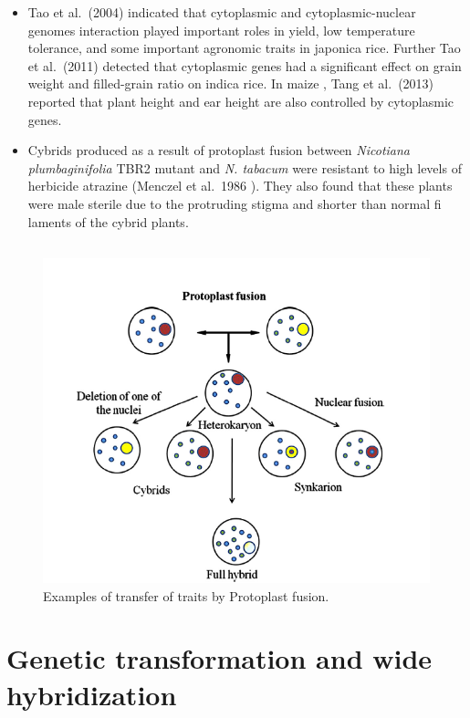 \documentclass[
  ignorenonframetext,
  aspectratio=169]{beamer}
\begin{document}
\begin{frame}{}
\begin{itemize}
\item
  Tao et al.~(2004) indicated that cytoplasmic and cytoplasmic-nuclear
  genomes interaction played important roles in yield, low temperature
  tolerance, and some important agronomic traits in japonica rice.
  Further Tao et al.~(2011) detected that cytoplasmic genes had a
  significant effect on grain weight and filled-grain ratio on indica
  rice. In maize , Tang et al.~(2013) reported that plant height and ear
  height are also controlled by cytoplasmic genes.
\item
  Cybrids produced as a result of protoplast fusion between
  \emph{Nicotiana plumbaginifolia} TBR2 mutant and \emph{N. tabacum}
  were resistant to high levels of herbicide atrazine (Menczel et
  al.~1986 ). They also found that these plants were male sterile due to
  the protruding stigma and shorter than normal fi laments of the cybrid
  plants.
\end{itemize}
\end{frame}

\hypertarget{section-9}{%
\subsection{}\label{section-9}}

\begin{frame}{}
\begin{figure}
\includegraphics[width=0.6\linewidth]{../images/protoplast_fusion} \caption{Examples of transfer of traits by Protoplast fusion.}\label{fig:traits-transmission-protoplast-fusion}
\end{figure}
\end{frame}

\hypertarget{genetic-transformation-and-wide-hybridization}{%
\section{Genetic transformation and wide
hybridization}\label{genetic-transformation-and-wide-hybridization}}
\end{document}

